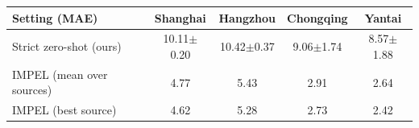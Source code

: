 \begin{tabular}{lcccc}
\toprule
Setting (MAE) & Shanghai & Hangzhou & Chongqing & Yantai \\
\midrule
Strict zero-shot (ours) & 10.11$\pm$0.20 & 10.42$\pm$0.37 & 9.06$\pm$1.74 & 8.57$\pm$1.88 \\
IMPEL (mean over sources) & 4.77 & 5.43 & 2.91 & 2.64 \\
IMPEL (best source) & 4.62 & 5.28 & 2.73 & 2.42 \\
\bottomrule
\end{tabular}
